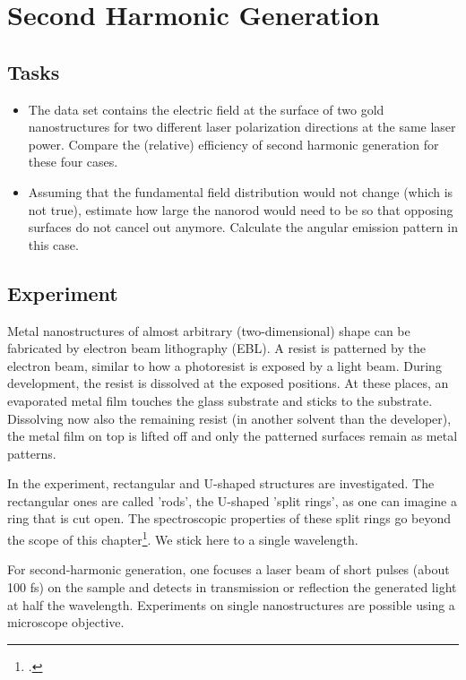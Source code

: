 \chapter{Second Harmonic Generation}


\section{Tasks}

\begin{itemize}
\item The data set contains the electric field at the surface of two gold nanostructures for two different laser polarization directions at the same laser power. Compare the (relative)  efficiency of second harmonic generation for these four cases.

\item Assuming that the fundamental field distribution would not change (which is not true), estimate how large the nanorod would need to be so that opposing surfaces do not cancel out anymore. Calculate the angular emission pattern in this case.
\end{itemize}

\section{Experiment}

Metal nanostructures of almost arbitrary (two-dimensional) shape can be fabricated by electron beam lithography (EBL). A resist is patterned by the electron beam, similar to how a photoresist is exposed by a light beam. During development, the resist is dissolved at the exposed positions. At these places, an evaporated metal film touches the glass substrate and sticks to the substrate. Dissolving now also the remaining resist (in another solvent than the developer), the metal film on top is lifted off and only the patterned surfaces remain as metal patterns.

In the experiment, rectangular and U-shaped structures are investigated. The rectangular ones are called 'rods', the U-shaped 'split rings', as one can imagine a ring that is cut open. The spectroscopic properties of these split rings go beyond the scope of this chapter\footcite{klein06_science}. We stick here to a single wavelength.

For second-harmonic generation, one focuses a  laser beam of short pulses (about 100 fs) on the sample and detects in transmission or reflection the generated light at half the wavelength. Experiments on single nanostructures are possible using a microscope objective.

